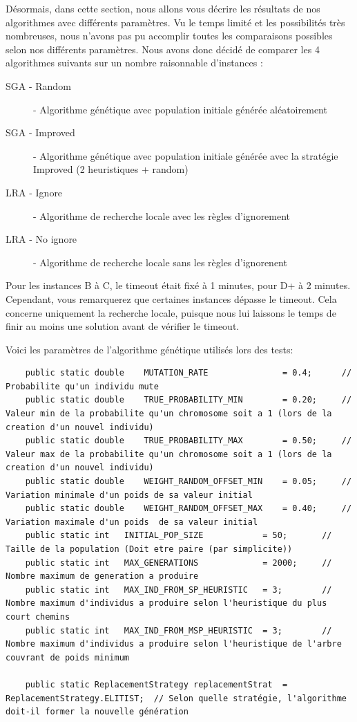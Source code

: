 	Désormais, dans cette section, nous allons vous décrire les résultats de nos algorithmes avec différents paramètres. Vu le temps limité et les possibilités très nombreuses, nous n'avons pas pu accomplir toutes les
comparaisons possibles selon nos différents paramètres. Nous avons donc décidé de comparer les 4 algorithmes suivants sur un nombre raisonnable d'instances :

	\begin{description}
	\item[SGA - Random  ]	- Algorithme génétique avec population initiale générée aléatoirement
	\item[SGA - Improved]	- Algorithme génétique avec population initiale générée avec la stratégie Improved (2 heuristiques + random)
	\item[LRA - Ignore  ]	- Algorithme de recherche locale avec les règles d'ignorement
	\item[LRA - No ignore]	- Algorithme de recherche locale sans les règles d'ignorenent
	\end{description}

	Pour les instances B à C, le timeout était fixé à 1 minutes, pour D+ à 2 minutes. Cependant, vous remarquerez que certaines instances dépasse le timeout. Cela concerne uniquement la recherche locale, puisque nous lui laissons 
le temps de finir au moins une solution avant de vérifier le timeout.

	Voici les paramètres de l'algorithme génétique utilisés lors des tests:

		\begin{lstlisting}
	public static double 	MUTATION_RATE 				= 0.4; 		// Probabilite qu'un individu mute
	public static double 	TRUE_PROBABILITY_MIN 		= 0.20; 	// Valeur min de la probabilite qu'un chromosome soit a 1 (lors de la creation d'un nouvel individu)
	public static double 	TRUE_PROBABILITY_MAX 		= 0.50; 	// Valeur max de la probabilite qu'un chromosome soit a 1 (lors de la creation d'un nouvel individu)
	public static double 	WEIGHT_RANDOM_OFFSET_MIN 	= 0.05; 	// Variation minimale d'un poids de sa valeur initial 
	public static double 	WEIGHT_RANDOM_OFFSET_MAX 	= 0.40; 	// Variation maximale d'un poids  de sa valeur initial 
	public static int 	INITIAL_POP_SIZE 			= 50; 		// Taille de la population (Doit etre paire (par simplicite))
	public static int 	MAX_GENERATIONS 			= 2000; 	// Nombre maximum de generation a produire
	public static int 	MAX_IND_FROM_SP_HEURISTIC 	= 3; 		// Nombre maximum d'individus a produire selon l'heuristique du plus court chemins
	public static int 	MAX_IND_FROM_MSP_HEURISTIC 	= 3; 		// Nombre maximum d'individus a produire selon l'heuristique de l'arbre couvrant de poids minimum

	public static ReplacementStrategy replacementStrat 	= ReplacementStrategy.ELITIST; 	// Selon quelle stratégie, l'algorithme doit-il former la nouvelle génération
	\end{lstlisting}

